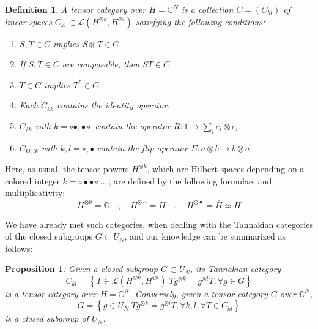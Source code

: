 \documentclass[12pt]{amsbook}
\newtheorem{definition}[theorem]{Definition}
\newtheorem{proposition}[theorem]{Proposition}
\begin{document}
\begin{definition}
A tensor category over $H=\mathbb C^N$ is a collection $C=(C_{kl})$ of linear spaces $C_{kl}\subset\mathcal L(H^{\otimes k},H^{\otimes l})$ satisfying the following conditions:
\begin{enumerate}
\item $S,T\in C$ implies $S\otimes T\in C$.

\item If $S,T\in C$ are composable, then $ST\in C$.

\item $T\in C$ implies $T^*\in C$.

\item Each $C_{kk}$ contains the identity operator.

\item $C_{\emptyset k}$ with $k=\circ\bullet,\bullet\circ$ contain the operator $R:1\to\sum_ie_i\otimes e_i$.

\item $C_{kl,lk}$ with $k,l=\circ,\bullet$ contain the flip operator $\Sigma:a\otimes b\to b\otimes a$.
\end{enumerate}
\end{definition}

Here, as usual, the tensor powers $H^{\otimes k}$, which are Hilbert spaces depending on a colored integer $k=\circ\bullet\bullet\circ\ldots\,$, are defined by the following formulae, and multiplicativity:
$$H^{\otimes\emptyset}=\mathbb C\quad,\quad 
H^{\otimes\circ}=H\quad,\quad
H^{\otimes\bullet}=\bar{H}\simeq H$$

We have already met such categories, when dealing with the Tannakian categories of the closed subgroups $G\subset U_N$, and our knowledge can be summarized as follows:

\begin{proposition}
Given a closed subgroup $G\subset U_N$, its Tannakian category
$$C_{kl}=\left\{T\in\mathcal L(H^{\otimes k},H^{\otimes l})\Big|Tg^{\otimes k}=g^{\otimes l}T,\forall g\in G\right\}$$
is a tensor category over $H=\mathbb C^N$. Conversely, given a tensor category $C$ over $\mathbb C^N$,
$$G=\left\{g\in U_N\Big|Tg^{\otimes k}=g^{\otimes l}T,\forall k,l,\forall T\in C_{kl}\right\}$$
is a closed subgroup of $U_N$.
\end{proposition}
\end{document}
